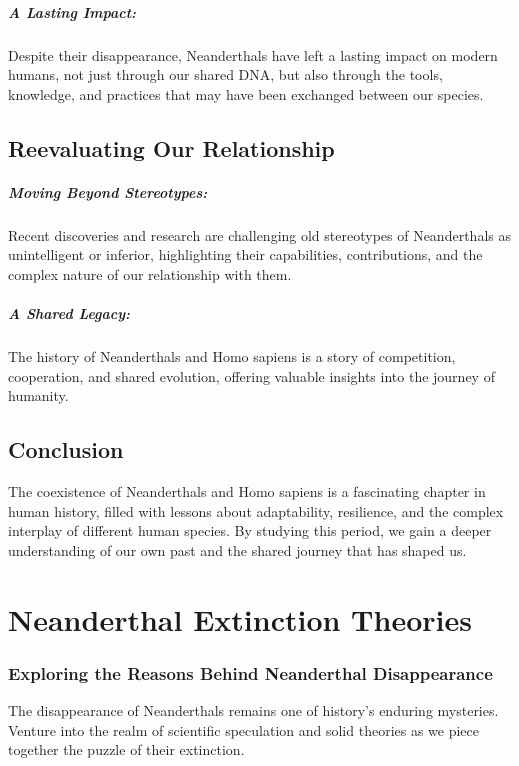 \documentclass[a4paper,12pt]{book}
\begin{document}
\paragraph{A Lasting Impact:}
Despite their disappearance, Neanderthals have left a lasting impact on modern humans, not just through our shared DNA, but also through the tools, knowledge, and practices that may have been exchanged between our species.

\section*{Reevaluating Our Relationship}

\paragraph{Moving Beyond Stereotypes:}
Recent discoveries and research are challenging old stereotypes of Neanderthals as unintelligent or inferior, highlighting their capabilities, contributions, and the complex nature of our relationship with them.

\paragraph{A Shared Legacy:}
The history of Neanderthals and Homo sapiens is a story of competition, cooperation, and shared evolution, offering valuable insights into the journey of humanity.

\section*{Conclusion}

The coexistence of Neanderthals and Homo sapiens is a fascinating chapter in human history, filled with lessons about adaptability, resilience, and the complex interplay of different human species. By studying this period, we gain a deeper understanding of our own past and the shared journey that has shaped us.

\chapter{Neanderthal Extinction Theories}
\subsection*{Exploring the Reasons Behind Neanderthal Disappearance}
The disappearance of Neanderthals remains one of history's enduring mysteries. Venture into the realm of scientific speculation and solid theories as we piece together the puzzle of their extinction.
\end{document}
